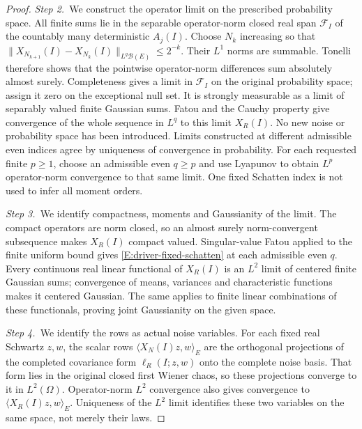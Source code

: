 \begin{proof}
  \medskip
  \noindent\textit{Step 2.~}We construct the operator limit on the prescribed
  probability space.
  All finite sums lie in the separable operator-norm closed real span
  $\mathcal{F}_I$ of the countably many deterministic $A_j(I)$. Choose $N_k$
  increasing so that $\|X_{N_{k+1}}(I)-X_{N_k}(I)\|_{L^q\mathcal{B}(E)} \le
  2^{-k}$. Their $L^1$ norms are summable. Tonelli therefore shows that the
  pointwise operator-norm differences sum absolutely almost surely. Completeness
  gives a limit in $\mathcal{F}_I$ on the original probability space; assign it
  zero on the exceptional null set. It is strongly measurable as a limit of
  separably valued finite Gaussian sums. Fatou and the Cauchy property give
  convergence of the whole sequence in $L^q$ to this limit $X_R(I)$. No new
  noise or probability space has been introduced. Limits constructed at
  different admissible even indices agree by uniqueness of convergence in
  probability. For each requested finite $p \ge 1$, choose an admissible even $q
  \ge p$ and use Lyapunov to obtain $L^p$ operator-norm convergence to that same
  limit. One fixed Schatten index is not used to infer all moment orders.


  \medskip
  \noindent\textit{Step 3.~}We identify compactness, moments and Gaussianity
  of the limit.
  The compact operators are norm closed, so an almost surely norm-convergent
  subsequence makes $X_R(I)$ compact valued. Singular-value Fatou applied to the
  finite uniform bound gives \eqref{E:driver-fixed-schatten} at each admissible
  even $q$. Every continuous real linear functional of $X_R(I)$ is an $L^2$
  limit of centered finite Gaussian sums; convergence of means, variances and
  characteristic functions makes it centered Gaussian. The same applies to
  finite linear combinations of these functionals, proving joint Gaussianity on
  the given space.

  \medskip
  \noindent\textit{Step 4.~}We identify the rows as actual noise variables.
  For each fixed real Schwartz $z,w$, the scalar rows $\langle
  X_N(I)z,w\rangle_E$ are the orthogonal projections of the completed covariance
  form $\ell_R(I;z,w)$ onto the complete noise basis. That form lies in the
  original closed first Wiener chaos, so these projections converge to it in
  $L^2(\Omega)$. Operator-norm $L^2$ convergence also gives convergence to
  $\langle X_R(I)z,w\rangle_E$. Uniqueness of the $L^2$ limit identifies these
  two variables on the same space, not merely their laws.


\end{proof}
